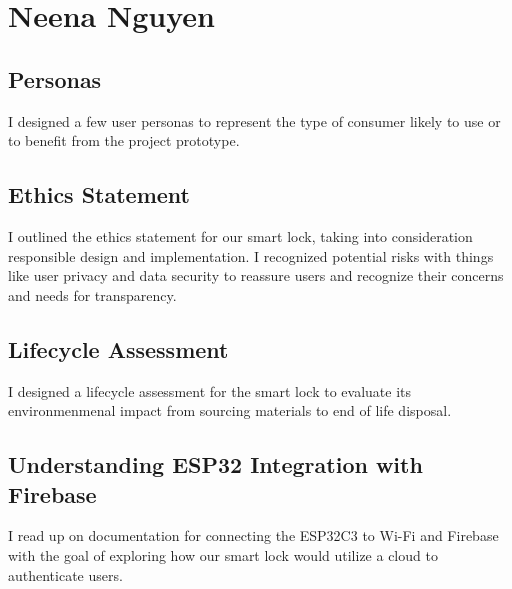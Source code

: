 \section{Neena Nguyen}

\subsection{Personas}
I designed a few user personas to represent the type of consumer likely to use or to benefit from the project prototype. 


\subsection{Ethics Statement}
I outlined the ethics statement for our smart lock, taking into consideration responsible design and implementation. I recognized potential risks with things like user privacy and data security to reassure users and recognize their concerns and needs for transparency.

\subsection{Lifecycle Assessment}
I designed a lifecycle assessment for the smart lock to evaluate its environmenmenal impact from sourcing materials to end of life disposal.

\subsection{Understanding ESP32 Integration with Firebase}
I read up on documentation for connecting the ESP32C3 to Wi-Fi and Firebase with the goal of exploring how our smart lock would utilize a cloud to authenticate users.
